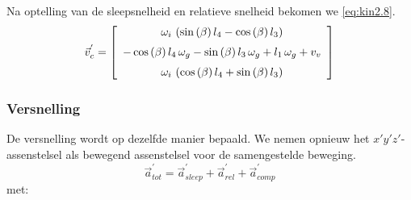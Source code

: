 Na optelling van de sleepsnelheid en relatieve snelheid bekomen we \eqref{eq:kin2.8}.
\begin{equation}
\vec{v}_{c}^{'}=\left[ \begin {array}{c} \omega_{i}\, \left( \sin \left( \beta
 \right) l_{4}-\cos \left( \beta \right) l_{3} \right) 
\\ \noalign{\medskip}-\cos \left( \beta \right) l_{4}\,\omega_{g}-\sin
 \left( \beta \right) l_{3}\,\omega_{g}+l_{1}\,\omega_{g}+v_{v}
\\ \noalign{\medskip}\omega_{i}\, \left( \cos \left( \beta \right) l_{
4}+\sin \left( \beta \right) l_{3} \right) \end {array} \right]
\label{eq:kin2.8}
\end{equation}
\newpage
\subsubsection{Versnelling}
\label{sec:versnelling}
De versnelling wordt op dezelfde manier bepaald. We nemen opnieuw het $x'y'z'$-assenstelsel als bewegend assenstelsel voor de samengestelde beweging.
\begin{equation}
\vec{a}_{tot}^{'}=\vec{a}_{sleep}^{'}+\vec{a}_{rel}^{'}+\vec{a}_{comp}^{'}
\label{eq:kin2.9}
\end{equation}
met:
